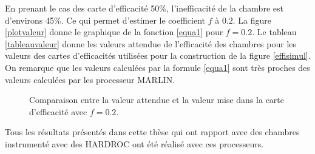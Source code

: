 En prenant le cas des carte d'efficacité 50\%, l'inefficacité de la chambre est d'environs 45\%. Ce qui permet d'estimer le coefficient $f$ à $0.2$. La figure \ref{plotvaleur} donne le graphique de la fonction \ref{equa1} pour $f=0.2$. Le tableau \ref{tableauvaleur} donne les valeurs attendue de l'efficacité des chambres pour les valeurs des cartes d'efficacités utilisées pour la construction de la figure \ref{effisimul}. On remarque que les valeurs calculées par la formule \ref{equa1} sont très proches des valeurs calculées par les processeur MARLIN.

	\begin{figure}[ht!]
    \hfill
	\caption{Comparaison entre la valeur attendue et la valeur mise dans la carte d'efficacité avec $f=0.2$. }
	\label{Comparaison}
\end{figure}

 Tous les résultats présentés dans cette thèse qui ont rapport avec des chambres instrumenté avec des HARDROC ont été réalisé avec ces processeurs.

